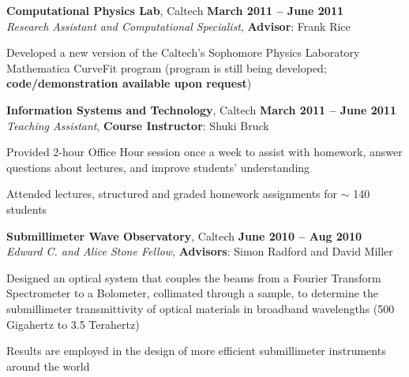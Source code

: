 \documentclass[margin,line]{resume}
\begin{document}
\begin{resume}
\textbf{Computational Physics Lab}, Caltech \hfill \textbf{March 2011 -- June 2011}\\
\textsl{Research Assistant and Computational Specialist}, \textbf{Advisor}: Frank Rice
\begin{list2}
  \item Developed a new version of the Caltech's Sophomore Physics Laboratory Mathematica CurveFit program (program is still being developed; \textbf{code/demonstration available upon request})
\end{list2}

\textbf{Information Systems and Technology}, Caltech \hfill \textbf{March 2011 -- June 2011}\\
\textsl{Teaching Assistant}, \textbf{Course Instructor}: Shuki Bruck
\begin{list2}
  \item Provided 2-hour Office Hour session once a week to assist with homework, answer questions about lectures, and improve students' understanding
  \item Attended lectures, structured and graded homework assignments for $\sim$ 140 students
\end{list2}

\textbf{Submillimeter Wave Observatory}, Caltech \hfill \textbf{June 2010 -- Aug 2010}\\
\textsl{Edward C. and Alice Stone Fellow}, \textbf{Advisors}: Simon Radford and David Miller
\begin{list2}
  \item Designed an optical system that couples the beams from a Fourier Transform Spectrometer to a Bolometer, collimated through a sample, to determine the submillimeter transmittivity of optical materials in broadband wavelengths (500 Gigahertz to 3.5 Terahertz)
  \item Results are employed in the design of more efficient submillimeter instruments around the world
\end{list2}



\end{resume}
\end{document}
